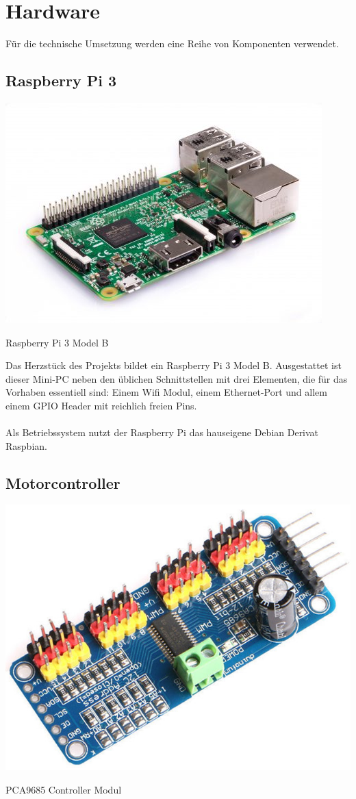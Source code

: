 \section{Hardware}
  Für die technische Umsetzung werden eine Reihe von Komponenten verwendet.

  \subsection{Raspberry Pi 3}
  
    \begin{minipage}{\columnwidth}
      \makeatletter
      \def\@captype{figure}
      \makeatother
      \centering
      \includegraphics[width=0.6\linewidth]{images/hw_raspberrypi3.jpg}
      \caption{Raspberry Pi 3 Model B}
      \label{fig:img-hw-01}
    \end{minipage}
    \vspace{1cm}

    \noindent
    Das Herzstück des Projekts bildet ein Raspberry Pi 3 Model B. Ausgestattet
    ist dieser Mini-PC neben den üblichen Schnittstellen mit drei Elementen, die
    für das Vorhaben essentiell sind: Einem Wifi Modul, einem Ethernet-Port und
    allem einem GPIO Header mit reichlich freien Pins.\\
    \ \\
    Als Betriebssystem nutzt der Raspberry Pi das hauseigene Debian Derivat
    Raspbian. \\

  \subsection{Motorcontroller}

    \begin{minipage}{\columnwidth}
      \makeatletter
      \def\@captype{figure}
      \makeatother
      \centering
      \includegraphics[width=0.4\linewidth]{images/hw_pca9685.jpg}
      \caption{PCA9685 Controller Modul}
      \label{fig:img-hw-02}
    \end{minipage}
    \vspace{1cm}

